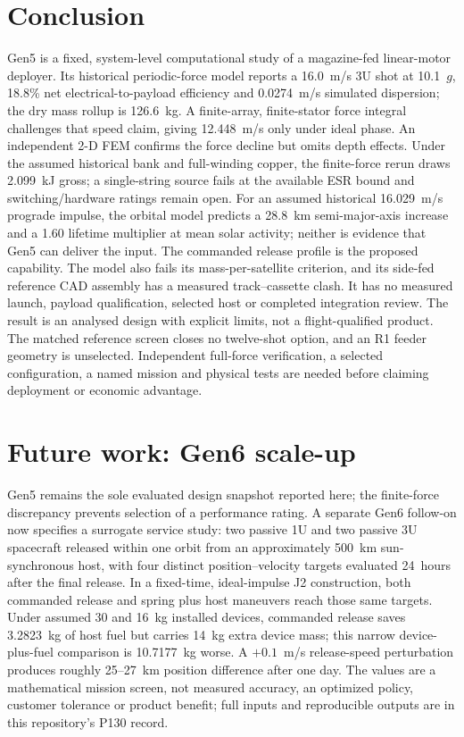 \documentclass[conference]{IEEEtran}
\begin{document}
\section{Conclusion}
Gen5 is a fixed, system-level computational study of a magazine-fed linear-motor deployer. Its historical periodic-force model reports a 16.0~m/s 3U shot at 10.1~$g$, 18.8\% net electrical-to-payload efficiency and 0.0274~m/s simulated dispersion; the dry mass rollup is 126.6~kg. A finite-array, finite-stator force integral challenges that speed claim, giving 12.448~m/s only under ideal phase. An independent 2-D FEM confirms the force decline but omits depth effects. Under the assumed historical bank and full-winding copper, the finite-force rerun draws 2.099~kJ gross; a single-string source fails at the available ESR bound and switching/hardware ratings remain open. For an assumed historical 16.029~m/s prograde impulse, the orbital model predicts a 28.8~km semi-major-axis increase and a 1.60 lifetime multiplier at mean solar activity; neither is evidence that Gen5 can deliver the input. The commanded release profile is the proposed capability. The model also fails its mass-per-satellite criterion, and its side-fed reference CAD assembly has a measured track--cassette clash. It has no measured launch, payload qualification, selected host or completed integration review. The result is an analysed design with explicit limits, not a flight-qualified product. The matched reference screen closes no twelve-shot option, and an R1 feeder geometry is unselected. Independent full-force verification, a selected configuration, a named mission and physical tests are needed before claiming deployment or economic advantage.

\section{Future work: Gen6 scale-up}\label{sec:future}
Gen5 remains the sole evaluated design snapshot reported here; the finite-force discrepancy prevents selection of a performance rating. A separate Gen6 follow-on now specifies a surrogate service study: two passive 1U and two passive 3U spacecraft released within one orbit from an approximately 500~km sun-synchronous host, with four distinct position--velocity targets evaluated 24~hours after the final release. In a fixed-time, ideal-impulse J2 construction, both commanded release and spring plus host maneuvers reach those same targets. Under assumed 30 and 16~kg installed devices, commanded release saves 3.2823~kg of host fuel but carries 14~kg extra device mass; this narrow device-plus-fuel comparison is 10.7177~kg worse. A $+0.1$~m/s release-speed perturbation produces roughly 25--27~km position difference after one day. The values are a mathematical mission screen, not measured accuracy, an optimized policy, customer tolerance or product benefit; full inputs and reproducible outputs are in this repository's P130 record.
\end{document}

